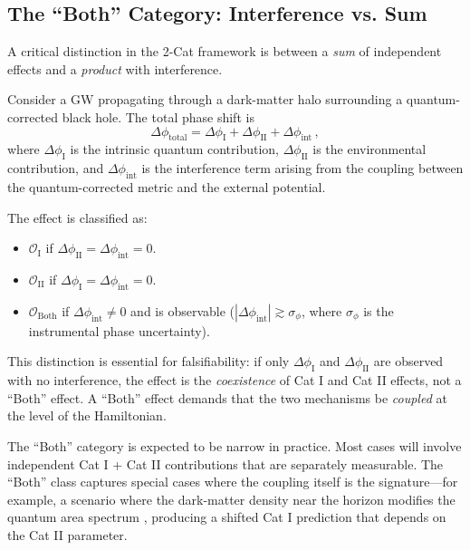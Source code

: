 \documentclass[11pt]{article}
\begin{document}
\subsection{The ``Both'' Category: Interference vs. Sum}

A critical distinction in the 2-Cat framework is between a \emph{sum} of independent effects and a \emph{product} with interference.

Consider a GW propagating through a dark-matter halo surrounding a quantum-corrected black hole. The total phase shift is
\begin{equation}
\Delta\phi_{\mathrm{total}} = \Delta\phi_{\mathrm{I}} + \Delta\phi_{\mathrm{II}} + \Delta\phi_{\mathrm{int}}\,,
\end{equation}
where $\Delta\phi_{\mathrm{I}}$ is the intrinsic quantum contribution, $\Delta\phi_{\mathrm{II}}$ is the environmental contribution, and $\Delta\phi_{\mathrm{int}}$ is the interference term arising from the coupling between the quantum-corrected metric and the external potential.

The effect is classified as:
\begin{itemize}
\item $\mathcal{O}_{\mathrm{I}}$ if $\Delta\phi_{\mathrm{II}} = \Delta\phi_{\mathrm{int}} = 0$.
\item $\mathcal{O}_{\mathrm{II}}$ if $\Delta\phi_{\mathrm{I}} = \Delta\phi_{\mathrm{int}} = 0$.
\item $\mathcal{O}_{\mathrm{Both}}$ if $\Delta\phi_{\mathrm{int}} \neq 0$ and is observable ($|\Delta\phi_{\mathrm{int}}| \gtrsim \sigma_{\phi}$, where $\sigma_{\phi}$ is the instrumental phase uncertainty).
\end{itemize}

This distinction is essential for falsifiability: if only $\Delta\phi_{\mathrm{I}}$ and $\Delta\phi_{\mathrm{II}}$ are observed with no interference, the effect is the \emph{coexistence} of Cat I and Cat II effects, not a ``Both'' effect. A ``Both'' effect demands that the two mechanisms be \emph{coupled} at the level of the Hamiltonian.

The ``Both'' category is expected to be narrow in practice. Most cases will involve independent Cat I + Cat II contributions that are separately measurable. The ``Both'' class captures special cases where the coupling itself is the signature---for example, a scenario where the dark-matter density near the horizon modifies the quantum area spectrum \cite{Barausse:2020}, producing a shifted Cat I prediction that depends on the Cat II parameter.
\end{document}
